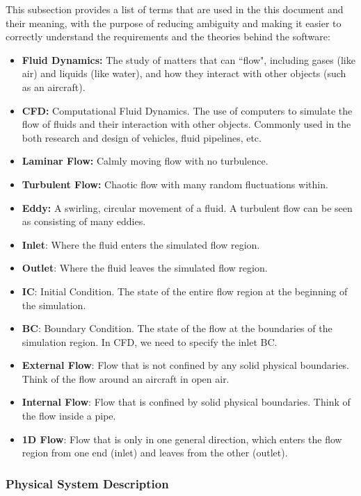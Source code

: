 \documentclass[12pt]{article}
\begin{document}
This subsection provides a list of terms that are used in the this document and their meaning, with the purpose of reducing ambiguity and making it easier to correctly understand the requirements and the theories behind the software:

\begin{itemize}
  \item \textbf{Fluid Dynamics:} The study of matters that can ``flow", including gases (like air) and liquids (like water), and how they interact with other objects (such as an aircraft).
  \item \textbf{CFD:} Computational Fluid Dynamics. The use of computers to simulate the flow of fluids and their interaction with other objects. Commonly used in the both research and design of vehicles, fluid pipelines, etc.
  \item \textbf{Laminar Flow:} Calmly moving flow with no turbulence.
  \item \textbf{Turbulent Flow:} Chaotic flow with many random fluctuations within.
  \item \textbf{Eddy:} A swirling, circular movement of a fluid. A turbulent flow can be seen as consisting of many eddies.
  \item \textbf{Inlet}: Where the fluid enters the simulated flow region.
  \item \textbf{Outlet}: Where the fluid leaves the simulated flow region.
  \item \textbf{IC}: Initial Condition. The state of the entire flow region at the beginning of the simulation.
  \item \textbf{BC}: Boundary Condition. The state of the flow at the boundaries of the simulation region. In CFD, we need to specify the inlet BC. 
  \item \textbf{External Flow}: Flow that is not confined by any solid physical boundaries. Think of the flow around an aircraft in open air.
  \item \textbf{Internal Flow}: Flow that is confined by solid physical boundaries. Think of the flow inside a pipe.
  \item \textbf{1D Flow}: Flow that is only in one general direction, which enters the flow region from one end (inlet) and leaves from the other (outlet).
  \end{itemize}

\subsubsection{Physical System Description} \label{sec_phySystDescrip}
\end{document}
